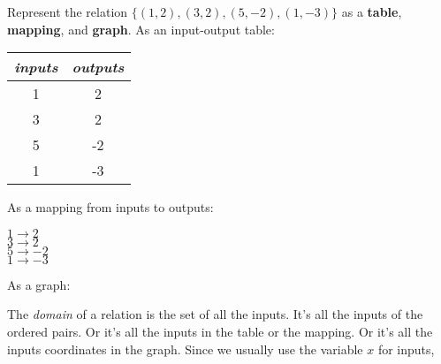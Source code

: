 \begin{myExample}{
    Represent the relation
    \(
        \{ (1,2), (3,2), (5,-2), (1,-3) \}
    \)
    as a {\bfseries table}, {\bfseries mapping}, and {\bfseries graph}.
}
    As an input-output table:

    \begin{center}
    \begin{tabular}{cc}
        \toprule
        \emph{inputs} & \emph{outputs} \\
        \midrule
        1 & 2\\
        3 & 2\\
        5 & -2\\
        1 & -3\\
        \bottomrule
    \end{tabular}
    \end{center}

    As a mapping from inputs to outputs:

    \begin{center}
        \(
            1 \longrightarrow 2
        \)\\
        \(
            3 \longrightarrow 2
        \)\\
        \(
            5 \longrightarrow -2
        \)\\
        \(
            1 \longrightarrow -3
        \)
    \end{center}

    As a graph:

    \begin{center}
    \end{center}
\end{myExample}


The \emph{domain} of a relation is the set of all the inputs.
It's all the inputs of the ordered pairs.
Or it's all the inputs in the table or the mapping.
Or it's all the inputs coordinates in the graph.
Since we usually use the variable $x$ for inputs,


